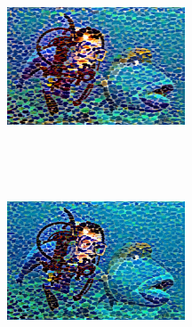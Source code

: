 \begin{multicols}{2}
    \begin{center}
        \captionsetup{type=figure}
        \includegraphics[width=200px, height=200px]{images/comb-mosaic-2.png}
    \end{center}
    \begin{center}
        \captionsetup{type=figure}
        \includegraphics[width=200px, height=200px]{images/comb-mosaic-3.png}
    \end{center}
\end{multicols}
